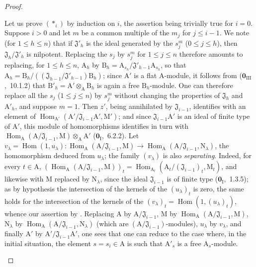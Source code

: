\begin{proof}
\begin{enumerate}[label=(\roman*)]
  Let us prove $(*_i)$ by induction on $i$, the assertion being trivially true for $i=0$.
  Suppose $i>0$ and let $m$ be a common multiple of the $m_j$ for $j\leq i-1$.
  We note (for $1\leq h\leq n$) that if $\mathfrak{J}'_h$ is the ideal generated by the $s_j^m$ ($0\leq j\leq h$), then $\mathfrak{J}_h/\mathfrak{J}'_h$ is nilpotent.
  Replacing the $s_j$ by $s_j^m$ for $1\leq j\leq n$ therefore amounts to replacing, for $1\leq h\leq n$, $\mathrm{A}_h$ by
  $\mathrm{B}_h=\mathrm{A}_{s_h}/\mathfrak{J}'_{h-1}\mathrm{A}_{s_h}$, so that
  $\mathrm{A}_h=\mathrm{B}_h/((\mathfrak{J}_{h-1}/\mathfrak{J}'_{h-1})\mathrm{B}_h)$; since $\mathrm{A}'$ is a flat $\mathrm{A}$-module, it follows from ($\mathbf{0}_{\mathrm{III}}$,~10.1.2) that $\mathrm{B}'_h=\mathrm{A}'\otimes_\mathrm{A}\mathrm{B}_h$ is again a free $\mathrm{B}_h$-module.
  One can therefore
  replace all the $s_j$ ($1\leq j\leq n$) by $s_j^m$ without changing the properties of $\mathfrak{J}_h$ and $\mathrm{A}'_h$, and suppose $m=1$.
  Then $z'$, being annihilated by $\mathfrak{J}_{i-1}$, identifies with an element of $\operatorname{Hom}_{\mathrm{A}'}(\mathrm{A}'/\mathfrak{J}_{i-1}\mathrm{A}',\mathrm{M}')$; and since $\mathfrak{J}_{i-1}\mathrm{A}'$ is an ideal of finite type of $\mathrm{A}'$, this module of homomorphisms identifies in turn with $\operatorname{Hom}_\mathrm{A}(\mathrm{A}/\mathfrak{J}_{i-1},\mathrm{M})\otimes_\mathrm{A}\mathrm{A}'$ ($\mathbf{0}_{\mathrm{I}}$,~6.2.2).
  Let $v_\lambda=\operatorname{Hom}(1,u_\lambda):\operatorname{Hom}_\mathrm{A}(\mathrm{A}/\mathfrak{J}_{i-1},\mathrm{M})\to\operatorname{Hom}_\mathrm{A}(\mathrm{A}/\mathfrak{J}_{i-1},\mathrm{N}_\lambda)$, the homomorphism deduced from $u_\lambda$; the family $(v_\lambda)$ is also \emph{separating}.
  Indeed, for every $t\in\mathrm{A}$,
  $(\operatorname{Hom}_\mathrm{A}(\mathrm{A}/\mathfrak{J}_{i-1},\mathrm{M}))_t
  =\operatorname{Hom}_{\mathrm{A}_t}(\mathrm{A}_t/(\mathfrak{J}_{i-1})_t,\mathrm{M}_t)$,
  and likewise with $\mathrm{M}$ replaced by $\mathrm{N}_\lambda$, since the ideal $\mathfrak{J}_{i-1}$ is of finite type ($\mathbf{0}_{\mathrm{I}}$,~1.3.5); as by hypothesis the intersection of the kernels of the $(u_\lambda)_t$ is zero, the same holds for the intersection of the kernels of the $(v_\lambda)_t=\operatorname{Hom}(1,(u_\lambda)_t)$, whence our assertion by .
  Replacing $\mathrm{A}$ by $\mathrm{A}/\mathfrak{J}_{i-1}$, $\mathrm{M}$ by $\operatorname{Hom}_\mathrm{A}(\mathrm{A}/\mathfrak{J}_{i-1},\mathrm{M})$, $\mathrm{N}_\lambda$ by $\operatorname{Hom}_\mathrm{A}(\mathrm{A}/\mathfrak{J}_{i-1},\mathrm{N}_\lambda)$ (which are $(\mathrm{A}/\mathfrak{J}_{i-1})$-modules), $u_\lambda$ by $v_\lambda$, and finally $\mathrm{A}'$ by $\mathrm{A}'/\mathfrak{J}_{i-1}\mathrm{A}'$, one sees that one can reduce to the case where, in the initial situation, the element $s=s_i\in\mathrm{A}$ is such that $\mathrm{A}'_s$ is a free $\mathrm{A}_s$-module.

\end{enumerate}
\end{proof}
